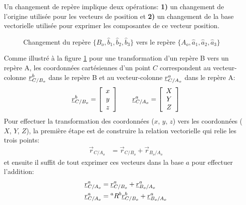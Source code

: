 Un changement de repère implique deux opérations: \textbf{1)} un changement de l'origine utilisée pour les vecteurs de position et \textbf{2)} un changement de la base vectorielle utilisée pour exprimer les composantes de ce vecteur position. 
\begin{figure}[htpb]
        \centering
				\hspace{10pt}
        \caption{Changement du repère $\{B_o,\hat{b}_1,\hat{b}_2,\hat{b}_3\}$ vers  le repère $\{A_o,\hat{a}_1,\hat{a}_2,\hat{a}_3\}$}
				\label{fig:repcha}
\end{figure}
Comme illustré à la figure \ref{fig:repcha} pour une transformation d'un repère B vers un repère A, les coordonnées cartésiennes d'un point $C$ correspondent au vecteur-colonne $\underline{r}_{C/B_o}^b$ dans le repère B et au vecteur-colonne $\underline{r}_{C/A_o}^a$ dans le repère A:
\begin{align}
\underline{r}_{C/B_o}^b = 
\left[ \begin{array}{c} 
x \\ y \\ z
\end{array} \right]  \quad \quad
\underline{r}_{C/A_o}^a = 
\left[ \begin{array}{c} 
X \\ Y \\ Z
\end{array} \right] 
\end{align} 
Pour effectuer la transformation des coordonnées ($x$, $y$, $z$) vers les coordonnées ($X$, $Y$, $Z$), la première étape est de construire la relation vectorielle qui relie les trois points:
\begin{align}
\vec{r}_{C/A_o}   &= \vec{r}_{C/B_o}  + \vec{r}_{B_o/A_o} 
\end{align} 
et ensuite il suffit de tout exprimer ces vecteurs dans la base $a$ pour effectuer l'addition:
\begin{align}
\underline{r}_{C/A_o}^a &=         \underline{r}_{C/B_o}^a  + \underline{r}_{B_o/A_o}^a  \\
\underline{r}_{C/A_o}^a &= {}^aR^b \underline{r}_{C/B_o}^b  + \underline{r}_{B_o/A_o}^a 
\label{eq:reperechang}
\end{align} 
